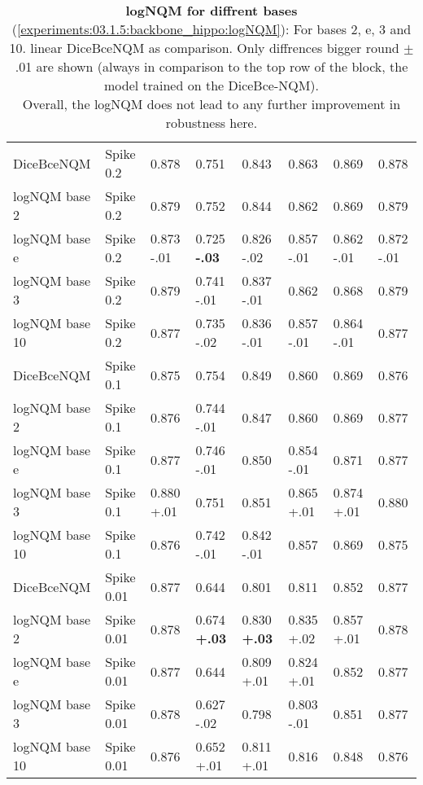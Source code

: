 \begin{table}[H]
\begin{tabular}{ll!{\vrule width 1.3pt}llllll}
        DiceBceNQM     & Spike 0.2    & 0.878 & 0.751 & 0.843 & 0.863 & 0.869 & 0.878\\
        logNQM base 2  & Spike 0.2    & 0.879 & 0.752 & 0.844 & 0.862 & 0.869 & 0.879\\
        logNQM base e  & Spike 0.2    & 0.873 -.01 & 0.725 \textbf{-.03} & 0.826 -.02 & 0.857 -.01 & 0.862 -.01 & 0.872 -.01\\
        logNQM base 3  & Spike 0.2    & 0.879 & 0.741 -.01 & 0.837 -.01 & 0.862 & 0.868 & 0.879\\
        logNQM base 10 & Spike 0.2    & 0.877 & 0.735 -.02 & 0.836 -.01 & 0.857 -.01 & 0.864 -.01 & 0.877\\
        DiceBceNQM     & Spike 0.1    & 0.875 & 0.754 & 0.849 & 0.860 & 0.869 & 0.876\\
        logNQM base 2  & Spike 0.1    & 0.876 & 0.744 -.01 & 0.847 & 0.860 & 0.869 & 0.877\\
        logNQM base e  & Spike 0.1    & 0.877 & 0.746 -.01 & 0.850 & 0.854 -.01 & 0.871 & 0.877\\
        logNQM base 3  & Spike 0.1    & 0.880 +.01 & 0.751 & 0.851 & 0.865 +.01 & 0.874 +.01 & 0.880\\
        logNQM base 10 & Spike 0.1    & 0.876 & 0.742 -.01 & 0.842 -.01 & 0.857 & 0.869 & 0.875\\
        DiceBceNQM     & Spike 0.01   & 0.877 & 0.644 & 0.801 & 0.811 & 0.852 & 0.877\\
        logNQM base 2  & Spike 0.01   & 0.878 & 0.674 \textbf{+.03} & 0.830 \textbf{+.03} & 0.835 +.02 & 0.857 +.01 & 0.878\\
        logNQM base e  & Spike 0.01   & 0.877 & 0.644 & 0.809 +.01 & 0.824 +.01 & 0.852 & 0.877\\
        logNQM base 3  & Spike 0.01   & 0.878 & 0.627 -.02 & 0.798 & 0.803 -.01 & 0.851 & 0.877\\
        logNQM base 10 & Spike 0.01   & 0.876 & 0.652 +.01 & 0.811 +.01 & 0.816 & 0.848 & 0.876\\\bottomrule
    \end{tabular}
    \caption{\textbf{logNQM for diffrent bases} (\autoref{experiments:03.1.5:backbone_hippo:logNQM}): For bases 2, e, 3 and 10. linear DiceBceNQM as comparison. Only diffrences bigger round $\pm$.01 are shown (always in comparison to the top row of the block, the model trained on the DiceBce-NQM).\\Overall, the logNQM does not lead to any further improvement in robustness here.}
    \label{tab:3.1.5:logNQM}
\end{table}